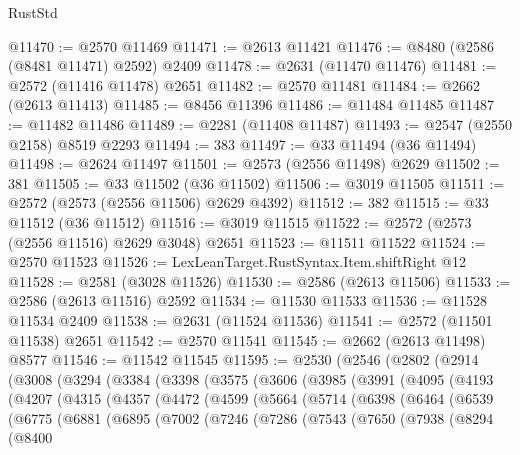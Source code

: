 \begin{lexlean}{RustStd}
\begin{coremodule}
@11470 := @2570 @11469
@11471 := @2613 @11421
@11476 := @8480 (@2586 (@8481 @11471) @2592) @2409
@11478 := @2631 (@11470 @11476)
@11481 := @2572 (@11416 @11478) @2651
@11482 := @2570 @11481
@11484 := @2662 (@2613 @11413)
@11485 := @8456 @11396
@11486 := @11484 @11485
@11487 := @11482 @11486
@11489 := @2281 (@11408 @11487)
@11493 := @2547 (@2550 @2158) @8519 @2293
@11494 := 383
@11497 := @33 @11494 (@36 @11494)
@11498 := @2624 @11497
@11501 := @2573 (@2556 @11498) @2629
@11502 := 381
@11505 := @33 @11502 (@36 @11502)
@11506 := @3019 @11505
@11511 := @2572 (@2573 (@2556 @11506) @2629 @4392)
@11512 := 382
@11515 := @33 @11512 (@36 @11512)
@11516 := @3019 @11515
@11522 := @2572 (@2573 (@2556 @11516) @2629 @3048) @2651
@11523 := @11511 @11522
@11524 := @2570 @11523
@11526 := LexLeanTarget.RustSyntax.Item.shiftRight @12
@11528 := @2581 (@3028 @11526)
@11530 := @2586 (@2613 @11506)
@11533 := @2586 (@2613 @11516) @2592
@11534 := @11530 @11533
@11536 := @11528 @11534 @2409
@11538 := @2631 (@11524 @11536)
@11541 := @2572 (@11501 @11538) @2651
@11542 := @2570 @11541
@11545 := @2662 (@2613 @11498) @8577
@11546 := @11542 @11545
@11595 := @2530
    (@2546
      (@2802
        (@2914
          (@3008
            (@3294
              (@3384
                (@3398
                  (@3575
                    (@3606
                      (@3985
                        (@3991
                          (@4095
                            (@4193
                              (@4207
                                (@4315
                                  (@4357
                                    (@4472
                                      (@4599
                                        (@5664
                                          (@5714
                                            (@6398
                                              (@6464
                                                (@6539
                                                  (@6775
                                                    (@6881
                                                      (@6895
                                                        (@7002
                                                          (@7246
                                                            (@7286
                                                              (@7543
                                                                (@7650
                                                                  (@7938
                                                                    (@8294
                                                                      (@8400

\end{coremodule}
\end{lexlean}
